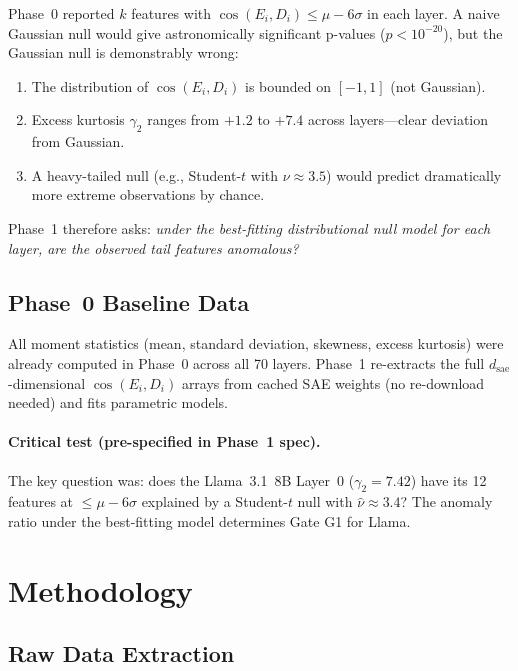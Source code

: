 \documentclass[11pt,a4paper]{article}
\newcommand{\cosED}{\cos(E_i, D_i)}
\begin{document}
Phase~0 reported $k$ features with $\cosED \leq \mu - 6\sigma$ in each layer. A naive Gaussian null would give astronomically significant p-values ($p < 10^{-20}$), but the Gaussian null is demonstrably wrong:
\begin{enumerate}[nosep]
  \item The distribution of $\cosED$ is bounded on $[-1, 1]$ (not Gaussian).
  \item Excess kurtosis $\gamma_2$ ranges from $+1.2$ to $+7.4$ across layers---clear deviation from Gaussian.
  \item A heavy-tailed null (e.g., Student-$t$ with $\nu \approx 3.5$) would predict dramatically more extreme observations by chance.
\end{enumerate}

Phase~1 therefore asks: \emph{under the best-fitting distributional null model for each layer, are the observed tail features anomalous?}

\subsection{Phase~0 Baseline Data}

All moment statistics (mean, standard deviation, skewness, excess kurtosis) were already computed in Phase~0 across all 70 layers. Phase~1 re-extracts the full $d_\text{sae}$-dimensional $\cosED$ arrays from cached SAE weights (no re-download needed) and fits parametric models.

\paragraph{Critical test (pre-specified in Phase~1 spec).} The key question was: does the Llama~3.1~8B Layer~0 ($\gamma_2 = 7.42$) have its 12 features at $\leq\mu{-}6\sigma$ explained by a Student-$t$ null with $\hat\nu \approx 3.4$? The anomaly ratio under the best-fitting model determines Gate G1 for Llama.

\section{Methodology}
\label{sec:methodology}

\subsection{Raw Data Extraction}
\end{document}
